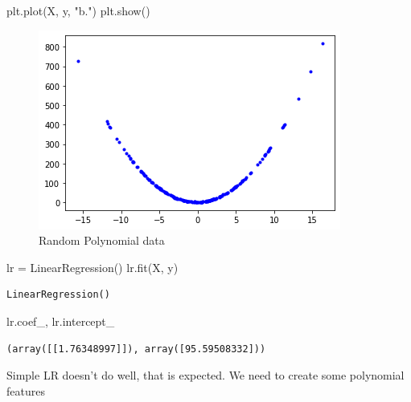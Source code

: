 \documentclass[
]{report}
\newenvironment{Shaded}{\begin{snugshade}}{\end{snugshade}}
\newcommand{\NormalTok}[1]{\textcolor[rgb]{0.00,0.23,0.31}{#1}}
\newcommand{\OperatorTok}[1]{\textcolor[rgb]{0.37,0.37,0.37}{#1}}
\newcommand{\StringTok}[1]{\textcolor[rgb]{0.13,0.47,0.30}{#1}}
\begin{document}
\begin{Shaded}
\begin{Highlighting}[]
\NormalTok{plt.plot(X, y, }\StringTok{"b."}\NormalTok{)}
\NormalTok{plt.show()}
\end{Highlighting}
\end{Shaded}

\begin{figure}[H]

{\centering \includegraphics{LinearModels_files/figure-pdf/random-polynomial-data-output-1.png}

}

\caption{Random Polynomial data}

\end{figure}

\begin{Shaded}
\begin{Highlighting}[]
\NormalTok{lr }\OperatorTok{=}\NormalTok{ LinearRegression()}
\NormalTok{lr.fit(X, y)}
\end{Highlighting}
\end{Shaded}

\begin{verbatim}
LinearRegression()
\end{verbatim}

\begin{Shaded}
\begin{Highlighting}[]
\NormalTok{lr.coef\_, lr.intercept\_}
\end{Highlighting}
\end{Shaded}

\begin{verbatim}
(array([[1.76348997]]), array([95.59508332]))
\end{verbatim}

Simple LR doesn't do well, that is expected. We need to create some
polynomial features
\end{document}
